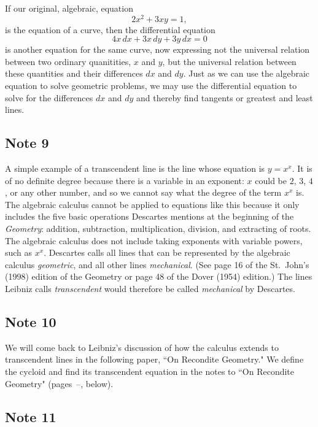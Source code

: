 \documentclass[polutonikogreek,english,twoside,openright]{article}
\begin{document}
If our original, algebraic, equation
$$2x^2 + 3xy = 1,$$
is the equation of a curve, then the differential equation
$$4x\,dx + 3x\,dy + 3y\,dx = 0$$
is another equation for the same curve, now expressing not the
universal relation between two ordinary quanitities, $x$ and $y$, but
the universal relation between these quantities and their differences
$dx$ and $dy$.  Just as we can use the algebraic equation to solve
geometric problems, we may use the differential equation to solve for
the differences $dx$ and $dy$ and thereby find tangents or greatest
and least lines.

\subsection*{Note 9}
\label{cnm9}

A simple example of a transcendent line is the line whose equation is
$y = x^x$.  It is of no definite degree because there is a variable in
an exponent: $x$ could be $2$, $3$, $4$, or any other number, and so
we cannot say what the degree of the term $x^x$ is.  The algebraic
calculus cannot be applied to equations like this because it only
includes the five basic operations Descartes mentions at the beginning
of the {\em Geometry}: addition, subtraction, multiplication,
division, and extracting of roots.  The algebraic calculus does not
include taking exponents with variable powers, such as $x^x$.
Descartes calls all lines that can be represented by the algebraic
calculus {\em geometric}, and all other lines {\em mechanical}. (See
page 16 of the St.\ John's (1998) edition of the Geometry or page 48
of the Dover (1954) edition.) The lines Leibniz calls {\em
  transcendent} would therefore be called {\em mechanical} by
Descartes.

\subsection*{Note 10}
\label{cnm10}

We will come back to Leibniz's discussion of how the calculus extends
to transcendent lines in the following paper, ``On Recondite
Geometry."  We define the cycloid and find its transcendent equation
in the notes to ``On Recondite Geometry"
(pages~\pageref{cycloid}--\pageref{ecycloid}, below).

\subsection*{Note 11}
\label{cnm11}
\end{document}
